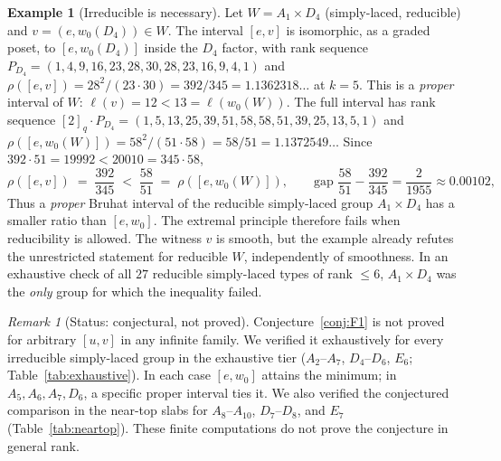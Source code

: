 \documentclass[11pt]{amsart}
\theoremstyle{plain}
\theoremstyle{definition}
\newtheorem{example}[theorem]{Example}
\theoremstyle{remark}
\newtheorem{remark}[theorem]{Remark}
\newcommand{\W}{W}
\begin{document}
\begin{example}[Irreducible is necessary]
\label{ex:F1-irreducible}
Let $\W=A_1\times D_4$ (simply-laced, reducible) and $v=(e,w_0(D_4))\in\W$.
The interval $[e,v]$ is isomorphic, as a graded poset, to $[e,w_0(D_4)]$
inside the $D_4$ factor, with rank sequence $P_{D_4}=
(1,4,9,16,23,28,30,28,23,16,9,4,1)$ and
$\rho([e,v])=28^2/(23\cdot30)=392/345=1.1362318\ldots$ at $k=5$. This is a
\emph{proper} interval of $\W$: $\ell(v)=12<13=\ell(w_0(\W))$. The full
interval has rank sequence $[2]_q\cdot P_{D_4}=
(1,5,13,25,39,51,58,58,51,39,25,13,5,1)$ and
$\rho([e,w_0(\W)])=58^2/(51\cdot58)=58/51=1.1372549\ldots$ Since
$392\cdot51=19992<20010=345\cdot58$,
\[
\rho([e,v]) \;=\; \frac{392}{345} \;<\; \frac{58}{51} \;=\; \rho([e,w_0(\W)]),
\qquad \text{gap } \frac{58}{51}-\frac{392}{345}=\frac{2}{1955}\approx0.00102,
\]
Thus a \emph{proper} Bruhat interval of the reducible simply-laced group
$A_1\times D_4$ has a smaller ratio than $[e,w_0]$. The extremal principle
therefore fails when reducibility is allowed. The witness $v$ is smooth,
but the example already refutes the unrestricted statement for reducible
$\W$, independently of smoothness. In an exhaustive check of all $27$
reducible simply-laced types of rank $\le 6$, $A_1\times D_4$ was the
\emph{only} group for which the inequality failed.
\end{example}

\begin{remark}[Status: conjectural, not proved]
Conjecture~\ref{conj:F1} is not proved for arbitrary $[u,v]$ in any
infinite family. We verified it exhaustively for every irreducible
simply-laced group in the exhaustive tier
($A_2$--$A_7$, $D_4$--$D_6$, $E_6$;
Table~\ref{tab:exhaustive}). In each case $[e,w_0]$ attains the minimum;
in $A_5,A_6,A_7,D_6$, a specific proper interval ties it. We also verified
the conjectured comparison in the near-top slabs for
$A_8$--$A_{10}$, $D_7$--$D_8$, and $E_7$
(Table~\ref{tab:neartop}). These finite computations do not prove the
conjecture in general rank.
\end{remark}
\end{document}
